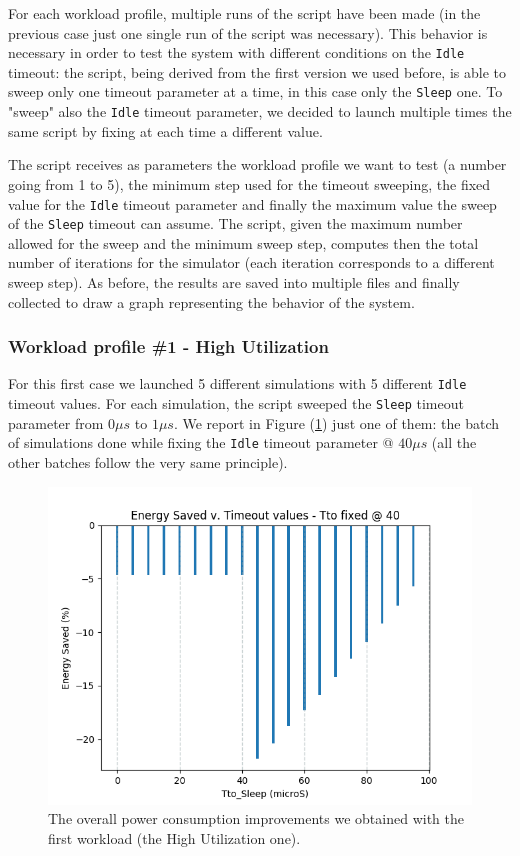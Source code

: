 \documentclass[a4paper]{article}
\begin{document}
            For each workload profile, multiple runs of the script have been made (in the previous case just one single run of the script was necessary). This behavior is necessary in order to test the system with different conditions on the \texttt{Idle} timeout: the script, being derived from the first version we used before, is able to sweep only one timeout parameter at a time, in this case only the \texttt{Sleep} one. To "sweep" also the \texttt{Idle} timeout parameter, we decided to launch multiple times the same script by fixing at each time a different value.

            The script receives as parameters the workload profile we want to test (a number going from 1 to 5), the minimum step used for the timeout sweeping, the fixed value for the \texttt{Idle} timeout parameter and finally the maximum value the sweep of the \texttt{Sleep} timeout can assume. The script, given the maximum number allowed for the sweep and the minimum sweep step, computes then the total number of iterations for the simulator (each iteration corresponds to a different sweep step). As before, the results are saved into multiple files and finally collected to draw a graph representing the behavior of the system.

        \subsubsection{Workload profile \#1 - High Utilization}
            For this first case we launched 5 different simulations with 5 different \texttt{Idle} timeout values. For each simulation, the script sweeped the \texttt{Sleep} timeout parameter from $0 \mu s$ to $1 \mu s$. We report in Figure (\ref{fig:Sleep_case1}) just one of them: the batch of simulations done while fixing the \texttt{Idle} timeout parameter @ $40 \mu s$ (all the other batches follow the very same principle).

            \begin{figure}[htp]
                \centering
                \includegraphics[width=0.6 \columnwidth]{./screenshots/Sleep_case1.png}
                \caption{
                        \label{fig:Sleep_case1}
                        The overall power consumption improvements we obtained with the first workload (the High Utilization one).
                }
            \end{figure}
\end{document}

